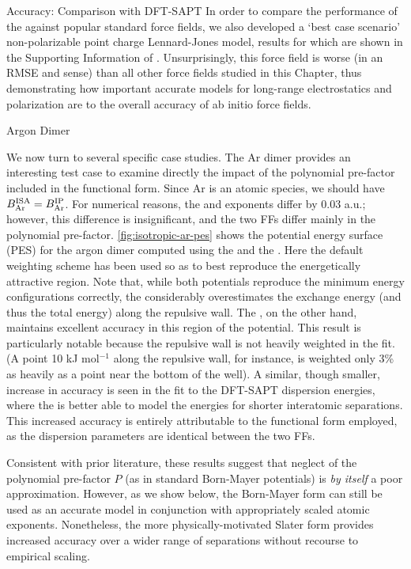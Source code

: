 \begin{subsection}{Accuracy: Comparison with DFT-SAPT}
In order to compare the performance of the \isaffold against popular standard
force fields, we also developed a `best case scenario' non-polarizable point
charge Lennard-Jones model, results for which are shown in the Supporting
Information of . Unsurprisingly, this force field is worse (in an
RMSE and \mse sense) than all
other force fields studied in this Chapter, thus demonstrating how important
accurate models for long-range electrostatics and polarization are to the
overall accuracy of ab initio force fields.

\begin{subsubsection}{Argon Dimer}

We now turn to several specific case studies. The Ar dimer provides an interesting test
case to examine directly the impact of the polynomial pre-factor included in
the \isaffold functional form. 
Since Ar is an atomic species, we should have $B^{\text{ISA}}_{\text{Ar}} = B^{\text{IP}}_{\text{Ar}}$.
For numerical reasons, the \isaffold and \saptff exponents differ by 0.03 a.u.;
however, this difference is insignificant, and the two FFs differ mainly in the
polynomial pre-factor.
\cref{fig:isotropic-ar-pes} shows the potential energy
surface (PES) for the argon dimer computed using the \isaffold and the \saptff.
Here the default weighting scheme has been used so as to best reproduce the energetically
attractive region. Note that, while both potentials reproduce the minimum energy
configurations correctly, the \saptff considerably overestimates the exchange energy (and thus
the total energy) along the repulsive wall.
The \isaffold, on the other hand, maintains excellent accuracy in this region of the
potential. This result is particularly notable because the repulsive wall is not heavily weighted in the fit.
(A point 10 kJ mol$^{-1}$ along the repulsive wall, for instance, is weighted only 3\% as
heavily as a point near the bottom of the well).
A similar, though smaller, increase in accuracy is seen in the fit to the
DFT-SAPT dispersion energies, where the \isaffold is better able to model the
energies for shorter interatomic separations.  This increased accuracy is
entirely attributable to the functional form employed, as the dispersion
parameters are identical between the two FFs.

Consistent with prior literature,\cite{Ihm1990, McDaniel2012} these results
suggest that neglect of the polynomial pre-factor $P$ (as in standard
Born-Mayer potentials) is \emph{by itself} a poor approximation. However, as
we show below, the Born-Mayer form can still be used as an accurate model
in conjunction with appropriately scaled atomic exponents. Nonetheless, the
more physically-motivated Slater form provides increased accuracy over a wider
range of separations without recourse to empirical scaling.



\end{subsubsection}
\end{subsection}
